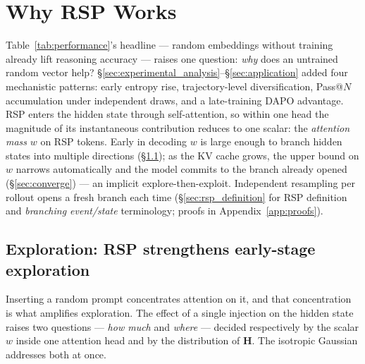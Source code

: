 
\section{Why RSP Works}\label{sec:why_rsp_works}

Table~\ref{tab:performance}'s headline --- random embeddings without training already lift reasoning accuracy --- raises one question: \emph{why} does an untrained random vector help? \S\ref{sec:experimental_analysis}--\S\ref{sec:application} added four mechanistic patterns: early entropy rise, trajectory-level diversification, Pass@$N$ accumulation under independent draws, and a late-training DAPO advantage. RSP enters the hidden state through self-attention, so within one head the magnitude of its instantaneous contribution reduces to one scalar: the \emph{attention mass} $w$ on RSP tokens. Early in decoding $w$ is large enough to branch hidden states into multiple directions (\S\ref{sec:improve}); as the KV cache grows, the upper bound on $w$ narrows automatically and the model commits to the branch already opened (\S\ref{sec:converge}) --- an implicit explore-then-exploit. Independent resampling per rollout opens a fresh branch each time (\S\ref{sec:rsp_definition} for RSP definition and \emph{branching event/state} terminology; proofs in Appendix~\ref{app:proofs}).

\subsection{Exploration: RSP strengthens early-stage exploration}\label{sec:improve}\label{sec:multipath}

Inserting a random prompt concentrates attention on it, and that concentration is what amplifies exploration. The effect of a single injection on the hidden state raises two questions --- \emph{how much} and \emph{where} --- decided respectively by the scalar $w$ inside one attention head and by the distribution of $\mathbf{H}$. The isotropic Gaussian addresses both at once.


